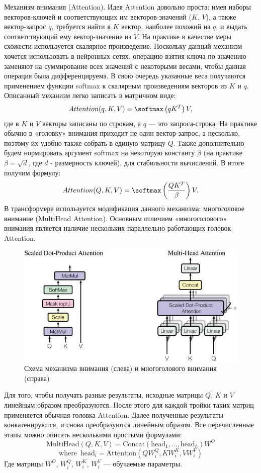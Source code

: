 \documentclass[12pt,a4paper]{article}
\begin{document}
Механизм внимания (Attention). Идея Attention довольно проста: имея наборы векторов-ключей и соответствующих им векторов-значений ($K$, $V$), а также вектор-запрос $q$, требуется найти в $K$ вектор, наиболее похожий на $q$, и выдать соответствующий ему вектор-значение из $V$. На практике в качестве меры схожести используется скалярное произведение. Поскольку данный механизм хочется использовать в нейронных сетях, операцию взятия ключа по значению заменяют на суммирование всех значений с некоторыми весами, чтобы данная операция была дифференцируема. В свою очередь указанные веса получаются применением функции softmax к скалярным произведениям векторов из $K$ и $q$. Описанный механизм легко записать в матричном виде:$$Attention(q, K, V) = \softmax \left(qK^T \right) V,$$
где в $K$ и $V$ векторы записаны по строкам, а $q$ --- это запроса-строка. На практике обычно в «головку» внимания приходит не один вектор-запрос, а несколько, поэтому их удобно также собрать в единую матрицу $Q$. Также дополнительно будем нормировать аргумент softmax на некоторую константу $\beta$ (на практике $\beta = \sqrt{d}$, где $d$ - размерность ключей), для стабильности вычислений. В итоге получим формулу:
$$Attention(Q, K, V) = \softmax \left(\frac{QK^T}{\beta} \right) V.$$
В трансформере используется модификация данного механизма: многоголовое внимание (MultiHead Attention). Основным отличием «многоголового» внимания является наличие нескольких параллельно работающих головок Attention.

\begin{figure}[H]
	\begin{center}
		\includegraphics[scale=0.65]{mh2.jpg}
	\end{center}
	\caption{Схема механизма внимания (слева) и многоголового внимания (справа) \cite{transformer}}
\end{figure}

\noindent Для того, чтобы получать разные результаты, исходные матрицы $Q$, $K$ и $V$ линейным образом преобразуются. После этого для каждой тройки таких матриц применяется обычная головка Attention. Далее полученные результаты конкатенируются, и снова преобразуются линейным образом. Все перечисленные этапы можно описать несколькими простыми формулами:
$$\mathrm{MultiHead} (Q, K, V) = \mathrm{Concat}(\mathrm{head}_1, \dots, \mathrm{head}_h) W^O$$
$$\mathrm{where} \enspace \mathrm{head}_i = \mathrm{Attention}(QW_i^Q, KW_i^K, VW_i^V)$$
\noindent Где матрицы $W^O$, $W_i^Q$, $W_i^K$, $W_i^V$ --- обучаемые параметры.
\end{document}
